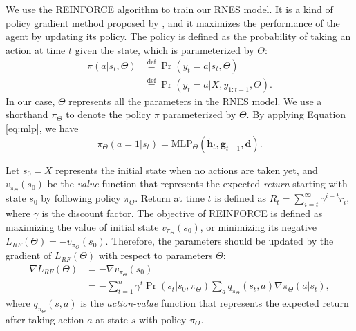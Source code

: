 \documentclass[letterpaper]{article} %
\begin{document}
	We use the REINFORCE algorithm to train our RNES model. It is a kind of policy gradient method proposed by  \cite{williams_simple_1992}, and it maximizes the performance of the agent by updating its policy. The policy is defined as the probability of taking an action at time $t$ given the state, which is parameterized by $\Theta$:
	\begin{align*}
	\pi(a|s_t,\Theta) &\overset{\text{def}}{=} \Pr(y_t=a|s_t,\Theta) \\
	&\overset{\text{def}}{=} \Pr(y_t=a|X, y_{1:t-1}, \Theta) .
	\end{align*}
	In our case, $\Theta$ represents all the parameters in the RNES model. We use a shorthand $\pi_{\Theta}$ to denote the policy $\pi$ parameterized by $\Theta$. By applying Equation \ref{eq:mlp}, we have
	\begin{equation*}
	\pi_{\Theta}(a=1|s_t) = \text{MLP}_{\Theta}(\overleftrightarrow{\mathbf{h}}_t, \mathbf{g}_{t-1}, \mathbf{d} ) .
	\end{equation*}
	
	Let $s_0=X$ represents the initial state when no actions are taken yet, and $v_{\pi_{\Theta}}(s_0)$ be the \emph{value} function that represents the expected \emph{return} starting with state $s_0$ by following policy $\pi_{\Theta}$. Return at time $t$ is defined as $R_t=\sum_{i=t}^{\infty} \gamma^{i-t} r_i$, where $\gamma$ is the discount factor. The objective of REINFORCE is defined as maximizing the value of initial state $v_{\pi_{\Theta}}(s_0)$, or minimizing its negative $L_{RF}(\Theta) = - v_{\pi_{\Theta}}(s_0)$. Therefore, the parameters should be updated by the gradient of $L_{RF}(\Theta)$ with respect to parameters $\Theta$:
	\begin{align*}
	\nabla L_{RF}(\Theta) &= - \nabla v_{\pi_{\Theta}}(s_0) \\ 
	&=- \sum_{t=1}^{n} \gamma^t \Pr(s_t | s_0, \pi_{\Theta}) \sum_{a} q_{\pi_{\Theta}}(s_t,a) \nabla \pi_{\Theta}(a|s_t) ,
	\end{align*} 
	where $q_{\pi_{\Theta}}(s,a)$ is the \emph{action-value} function that represents the expected return after taking action $a$ at state $s$ with policy $\pi_{\Theta}$. 
	
\end{document}
